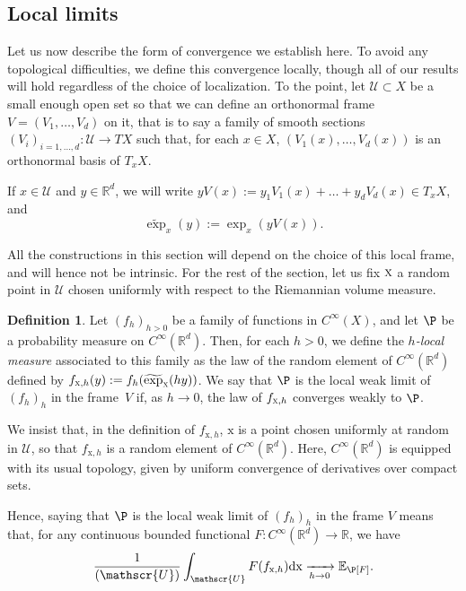 \documentclass[JEP,XML,SOM,Unicode,published]{cedram}
\let\mathcal\mathscr
\newcommand{\NoChangel}[1]{%
\expandafter\let\csname old\string#1\endcsname=#1
\let#1=\relax
\newcommand{#1}{\mathcode`l="716C\csname old\string#1\endcsname\mathcode`l="7160 }%
}
\theoremstyle{plain}
\theoremstyle{definition}
\newtheorem{definition}[theorem]{Definition}
\newcommand{\R}{\mathbb{R}}
\def\calU{\mathcal{U}}
\DeclareMathOperator{\Vol}{Vol}\NoChangel{\Vol}
\begin{document}
\subsection{Local limits}\label{ss:local_limits_def}

Let us now describe the form of convergence we establish here. To avoid any topological difficulties, we define this convergence locally, though all of our results will hold regardless of the choice of localization. To the point, let $\mathcal{U}\subset X$ be a small enough open set so that we can define an orthonormal frame $V=(V_1,\dots,V_d)$ on it, that is to say a family of smooth sections $(V_i)_{i=1,\dots,d} : \mathcal{U}\to TX$ such that, for each $x\in X$, $(V_1(x),\dots,V_d(x))$ is an orthonormal basis of $T_xX$.

If $x\in \mathcal{U}$ and $y\in \R^d$, we will write $yV(x) := y_1 V_1(x)+\dots+y_d V_d(x) \in T_xX$, and
\begin{equation}\label{eq:JamesBrownIsTheBest}
\widetilde{\exp}_{x}(y) := \exp_x (yV(x)).
\end{equation}

All the constructions in this section will depend on the choice of this local frame, and will hence not be intrinsic. For the rest of the section, let us fix $\textsc{x}$ a random point in $\calU$ chosen uniformly with respect to the Riemannian volume measure.
\begin{definition}
Let $(f_h)_{h>0}$ be a family of functions in $C^\infty(X)$, and let $\P$ be a probability measure on $C^\infty(\R^d)$. Then, for each $h>0$, we define the \emph{$h$-local measure} associated to this family as the law of the random element of $C^\infty(\R^d)$ defined by $f_{\textsc{x},h}(y):=f_h(\widetilde{\exp}_{\textsc{x}}(hy))$. We say that $\P$ is the local weak limit of $(f_h)_h$ in the frame~$V$ if, as $h\to 0$, the law of $f_{\textsc{x},h}$ converges weakly to $\P$.
\end{definition}

We insist that, in the definition of $f_{\mathrm{x},h}$, $\mathrm{x}$ is a point chosen uniformly at random in $\mathcal{U}$, so that $f_{\mathrm{x},h}$ is a random element of $C^{\infty}(\R^d)$. Here, $C^\infty(\R^d)$ is equipped with its usual topology, given by uniform convergence of derivatives over compact sets.

Hence, saying that $\P$ is the local weak limit of $(f_h)_h$ in the frame $V$ means that, for any continuous bounded functional $F: C^\infty(\R^d) \to \R$, we have
\[
\frac{1}{\Vol(\mathcal{U})} \int_\mathcal{U} F (f_{\mathrm{x},h})\mathrm{dx} \xrightarrow[h \to 0]{} \mathbb{E}_\P [F].
\]
\end{document}
